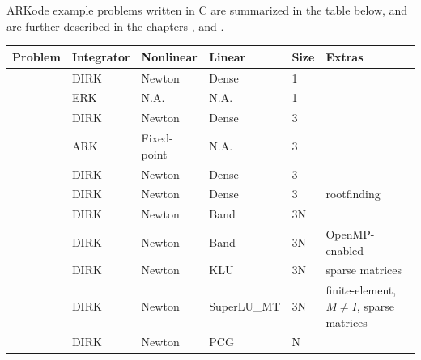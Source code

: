 \documentclass[letterpaper,10pt,english]{sphinxmanual}
\begin{document}
ARKode example problems written in C are summarized in the table
below, and are further described in the chapters {\hyperref[c_serial:serial-c]{\emph{}}},
{\hyperref[c_openmp:openmp-c]{\emph{}}} and {\hyperref[c_parallel:parallel-c]{\emph{}}}.

\begin{tabulary}{\linewidth}{|L|L|L|L|L|L|}
\hline
\textsf{\relax 
Problem
} & \textsf{\relax 
Integrator
} & \textsf{\relax 
Nonlinear
} & \textsf{\relax 
Linear
} & \textsf{\relax 
Size
} & \textsf{\relax 
Extras
}\\
\hline
{\hyperref[c_serial:ark-analytic]{\emph{}}}
 & 
DIRK
 & 
Newton
 & 
Dense
 & 
1
 & \\
\hline
{\hyperref[c_serial:ark-analytic-nonlin]{\emph{}}}
 & 
ERK
 & 
N.A.
 & 
N.A.
 & 
1
 & \\
\hline
{\hyperref[c_serial:ark-brusselator]{\emph{}}}
 & 
DIRK
 & 
Newton
 & 
Dense
 & 
3
 & \\
\hline
{\hyperref[c_serial:ark-brusselator-fp]{\emph{}}}
 & 
ARK
 & 
Fixed-point
 & 
N.A.
 & 
3
 & \\
\hline
{\hyperref[c_serial:ark-robertson]{\emph{}}}
 & 
DIRK
 & 
Newton
 & 
Dense
 & 
3
 & \\
\hline
{\hyperref[c_serial:ark-robertson-root]{\emph{}}}
 & 
DIRK
 & 
Newton
 & 
Dense
 & 
3
 & 
rootfinding
\\
\hline
{\hyperref[c_serial:ark-brusselator1d]{\emph{}}}
 & 
DIRK
 & 
Newton
 & 
Band
 & 
3N
 & \\
\hline
{\hyperref[c_openmp:ark-brusselator1d-omp]{\emph{}}}
 & 
DIRK
 & 
Newton
 & 
Band
 & 
3N
 & 
OpenMP-enabled
\\
\hline
{\hyperref[c_serial:ark-brusselator1d-klu]{\emph{}}}
 & 
DIRK
 & 
Newton
 & 
KLU
 & 
3N
 & 
sparse matrices
\\
\hline
{\hyperref[c_serial:ark-brusselator1d-fem-slu]{\emph{}}}
 & 
DIRK
 & 
Newton
 & 
SuperLU\_MT
 & 
3N
 & 
finite-element, \(M\ne I\), sparse matrices
\\
\hline
{\hyperref[c_serial:ark-heat1d]{\emph{}}}
 & 
DIRK
 & 
Newton
 & 
PCG
 & 
N
 & \\

\end{tabulary}
\end{document}
